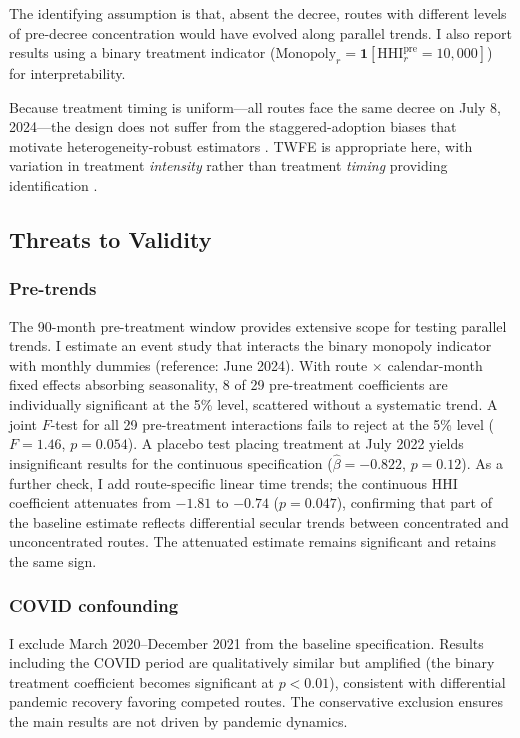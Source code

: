 \documentclass[12pt]{article}
\begin{document}
The identifying assumption is that, absent the decree, routes with different levels of pre-decree concentration would have evolved along parallel trends. I also report results using a binary treatment indicator ($\text{Monopoly}_r = \mathbf{1}[\text{HHI}_r^{\text{pre}} = 10{,}000]$) for interpretability.

Because treatment timing is uniform---all routes face the same decree on July 8, 2024---the design does not suffer from the staggered-adoption biases that motivate heterogeneity-robust estimators \citep{callaway2021, sun2021, dechaisemartin2020}. TWFE is appropriate here, with variation in treatment \textit{intensity} rather than treatment \textit{timing} providing identification \citep{goodman2021}.

\subsection{Threats to Validity}

\subsubsection*{Pre-trends} The 90-month pre-treatment window provides extensive scope for testing parallel trends. I estimate an event study that interacts the binary monopoly indicator with monthly dummies (reference: June 2024). With route $\times$ calendar-month fixed effects absorbing seasonality, 8 of 29 pre-treatment coefficients are individually significant at the 5\% level, scattered without a systematic trend. A joint $F$-test for all 29 pre-treatment interactions fails to reject at the 5\% level ($F = 1.46$, $p = 0.054$). A placebo test placing treatment at July 2022 yields insignificant results for the continuous specification ($\hat{\beta} = -0.822$, $p = 0.12$). As a further check, I add route-specific linear time trends; the continuous HHI coefficient attenuates from $-1.81$ to $-0.74$ ($p = 0.047$), confirming that part of the baseline estimate reflects differential secular trends between concentrated and unconcentrated routes. The attenuated estimate remains significant and retains the same sign.

\subsubsection*{COVID confounding} I exclude March 2020--December 2021 from the baseline specification. Results including the COVID period are qualitatively similar but amplified (the binary treatment coefficient becomes significant at $p < 0.01$), consistent with differential pandemic recovery favoring competed routes. The conservative exclusion ensures the main results are not driven by pandemic dynamics.
\end{document}
